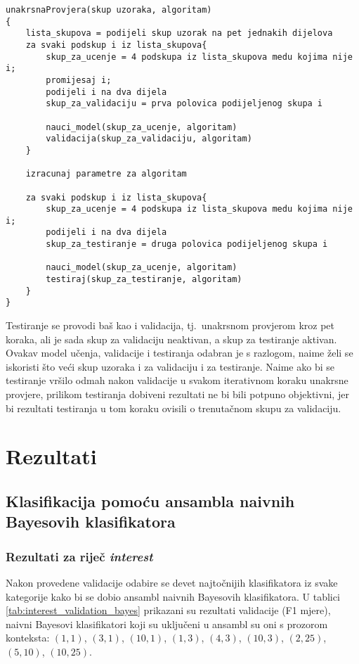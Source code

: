 \documentclass[10pt, a4paper]{article}
\begin{document}
\begin{lstlisting}[label=lst:Convolution1D,caption= Pseudok\^od implementirane unakrsne provjere]
unakrsnaProvjera(skup uzoraka, algoritam)
{
	lista_skupova = podijeli skup uzorak na pet jednakih dijelova
	za svaki podskup i iz lista_skupova{
		skup_za_ucenje = 4 podskupa iz lista_skupova medu kojima nije i;
		promijesaj i;
		podijeli i na dva dijela
		skup_za_validaciju = prva polovica podijeljenog skupa i
		
		nauci_model(skup_za_ucenje, algoritam)
		validacija(skup_za_validaciju, algoritam)
	}
		
	izracunaj parametre za algoritam
	
	za svaki podskup i iz lista_skupova{
		skup_za_ucenje = 4 podskupa iz lista_skupova medu kojima nije i;
		podijeli i na dva dijela
		skup_za_testiranje = druga polovica podijeljenog skupa i
		
		nauci_model(skup_za_ucenje, algoritam)
		testiraj(skup_za_testiranje, algoritam)
	} 	
}
\end{lstlisting}


Testiranje se provodi baš kao i validacija, tj.~unakrsnom provjerom kroz pet koraka, 
ali je sada skup za validaciju neaktivan, a skup za testiranje aktivan.
Ovakav model učenja, validacije i testiranja odabran je s razlogom, naime
želi se iskoristi što veći skup uzoraka i za validaciju i za testiranje.
Naime ako bi se testiranje vršilo odmah nakon validacije u svakom iterativnom
koraku unakrsne provjere, prilikom testiranja dobiveni rezultati ne bi bili
potpuno objektivni, jer bi rezultati testiranja u tom koraku ovisili
o trenutačnom skupu za validaciju. %

\section{Rezultati}
\subsection{Klasifikacija pomoću ansambla naivnih Bayesovih klasifikatora}
\subsubsection{Rezultati za riječ \emph{interest}} 
Nakon provedene validacije odabire se devet najtočnijih klasifikatora iz
svake kategorije kako bi se dobio ansambl naivnih Bayesovih klasifikatora. 
U tablici \ref{tab:interest_validation_bayes} prikazani su rezultati
validacije (F1 mjere), naivni Bayesovi klasifikatori koji su uključeni u ansambl su oni
s prozorom konteksta: $(1,1)$, $(3,1)$, $(10,1)$,
$(1,3)$, $(4,3)$, $(10,3)$, $(2,25)$, $(5,10)$, $(10,25)$.
\end{document}
